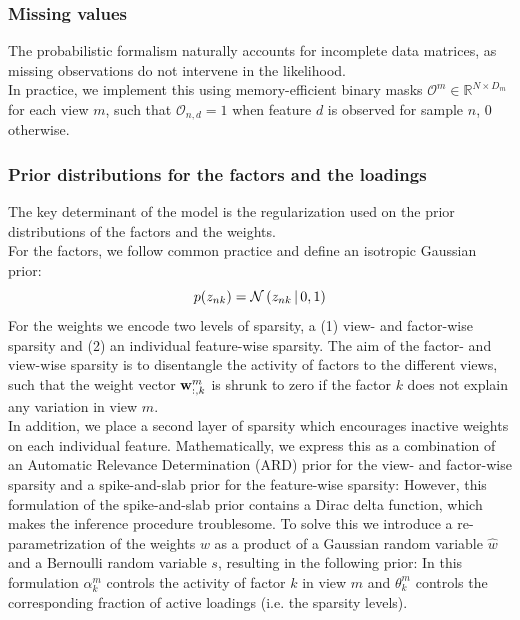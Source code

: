\subsubsection{Missing values}
The probabilistic formalism naturally accounts for incomplete data matrices, as missing observations do not intervene in the likelihood.\\
In practice, we implement this using memory-efficient binary masks $\mathcal{O}^m \in \mathbb{R}^{N\times D_m}$ for each view $m$, such that $\mathcal{O}_{n,d} = 1$ when feature $d$ is observed for sample $n$, 0 otherwise. 

\subsubsection{Prior distributions for the factors and the loadings}
The key determinant of the model is the regularization used on the prior distributions of the factors and the weights.\\
For the factors, we follow common practice \cite{XX} and define an isotropic Gaussian prior:
\begin{equation}
	p(z_{nk}) = \mathcal{N}\left(z_{nk} \,|\, 0,1\right)
\end{equation}
For the weights we encode two levels of sparsity, a (1) view- and factor-wise sparsity and (2) an individual feature-wise sparsity. The aim of the factor- and view-wise sparsity is to disentangle the activity of factors to the different views, such that the weight vector ${\bf w}_{:,k}^m$ is shrunk to zero if the factor $k$ does not explain any variation in view $m$. \\
In addition, we place a second layer of sparsity which encourages inactive weights on each individual feature. Mathematically, we express this as a combination of an Automatic Relevance Determination (ARD) prior \cite{Mackay1996} for the view- and factor-wise sparsity and a spike-and-slab prior \cite{Mitchell1988} for the feature-wise sparsity:
However, this formulation of the spike-and-slab prior contains a Dirac delta function, which makes the inference procedure troublesome. To solve this we introduce a re-parametrization of the weights $w$ as a product of a Gaussian random variable $\hat{w}$ and a Bernoulli random variable $s$, \cite{Titsias2011} resulting in the following prior:
In this formulation $\alpha_k^m$ controls the activity of factor $k$ in view $m$ and $\theta_k^m$ controls the corresponding fraction of active loadings (i.e. the sparsity levels).\\

